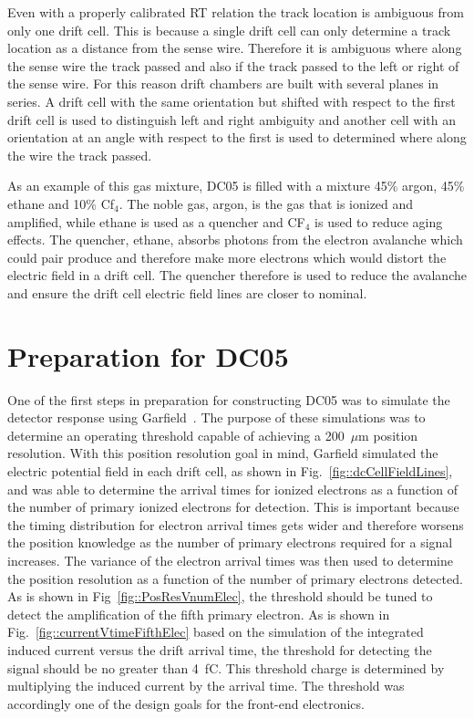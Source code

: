 Even with a properly calibrated RT relation the track location is ambiguous from
only one drift cell.  This is because a single drift cell can only determine a
track location as a distance from the sense wire.  Therefore it is ambiguous
where along the sense wire the track passed and also if the track passed to the
left or right of the sense wire.  For this reason drift chambers are built with
several planes in series.  A drift cell with the same orientation but shifted
with respect to the first drift cell is used to distinguish left and right
ambiguity and another cell with an orientation at an angle with respect to the
first is used to determined where along the wire the track passed.

As an example of this gas mixture, DC05 is filled with a mixture 45\% argon,
45\% ethane and 10\% Cf$_4$.  The noble gas, argon, is the gas that is ionized
and amplified, while ethane is used as a quencher and CF$_4$ is used to reduce
aging effects.  The quencher, ethane, absorbs photons from the electron
avalanche which could pair produce and therefore make more electrons which would
distort the electric field in a drift cell.  The quencher therefore is used to
reduce the avalanche and ensure the drift cell electric field lines are closer
to nominal.

\section{Preparation for DC05}

One of the first steps in preparation for constructing DC05 was to simulate the
detector response using Garfield~\cite{garfield}.  The purpose of these
simulations was to determine an operating threshold capable of achieving a
200~$\mu$m position resolution.  With this position resolution goal in mind,
Garfield simulated the electric potential field in each drift cell, as shown in
Fig.~\ref{fig::dcCellFieldLines}, and was able to determine the arrival times
for ionized electrons as a function of the number of primary ionized electrons
for detection.  This is important because the timing distribution for electron
arrival times gets wider and therefore worsens the position knowledge as the
number of primary electrons required for a signal increases.  The variance of
the electron arrival times was then used to determine the position resolution as
a function of the number of primary electrons detected.  As is shown in
Fig~\ref{fig::PosResVnumElec}, the threshold should be tuned to detect the
amplification of the fifth primary electron.  As is shown in
Fig.~\ref{fig::currentVtimeFifthElec} based on the simulation of the integrated
induced current versus the drift arrival time, the threshold for detecting the
signal should be no greater than 4~fC.  This threshold charge is determined by
multiplying the induced current by the arrival time.  The threshold was
accordingly one of the design goals for the front-end electronics.

